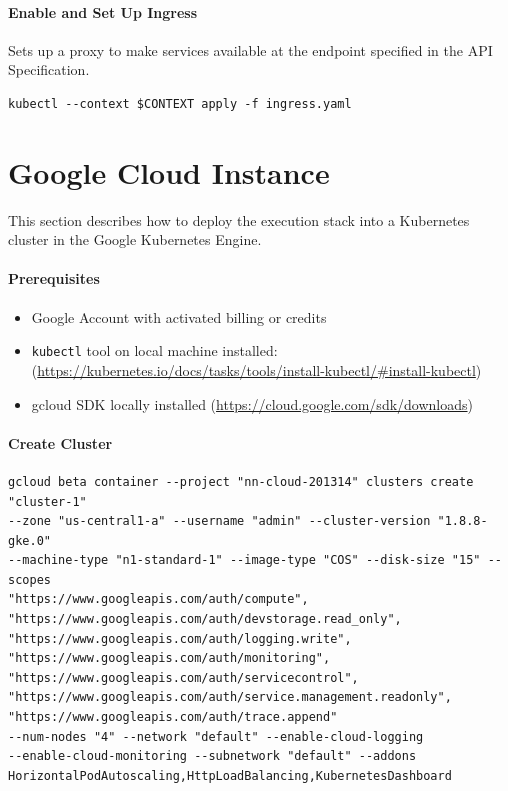 \paragraph{Enable and Set Up Ingress}\label{enable-and-set-up-ingress}

Sets up a proxy to make services available at the endpoint specified in
the API Specification.

\begin{verbatim}
kubectl --context $CONTEXT apply -f ingress.yaml
\end{verbatim}

\section{Google Cloud Instance}\label{google-cloud-instance}

This section describes how to deploy the execution stack into a
Kubernetes cluster in the Google Kubernetes Engine.

\paragraph{Prerequisites}\label{prerequisites-1}

\begin{itemize}
\item
  Google Account with activated billing or credits
\item
  \texttt{kubectl} tool on local machine installed:
  (\url{https://kubernetes.io/docs/tasks/tools/install-kubectl/\#install-kubectl})
\item
  gcloud SDK locally installed
  (\url{https://cloud.google.com/sdk/downloads})
\end{itemize}

\paragraph{Create Cluster}\label{create-cluster}

\begin{verbatim}
gcloud beta container --project "nn-cloud-201314" clusters create "cluster-1" 
--zone "us-central1-a" --username "admin" --cluster-version "1.8.8-gke.0" 
--machine-type "n1-standard-1" --image-type "COS" --disk-size "15" --scopes 
"https://www.googleapis.com/auth/compute",
"https://www.googleapis.com/auth/devstorage.read_only",
"https://www.googleapis.com/auth/logging.write",
"https://www.googleapis.com/auth/monitoring",
"https://www.googleapis.com/auth/servicecontrol",
"https://www.googleapis.com/auth/service.management.readonly",
"https://www.googleapis.com/auth/trace.append" 
--num-nodes "4" --network "default" --enable-cloud-logging 
--enable-cloud-monitoring --subnetwork "default" --addons 
HorizontalPodAutoscaling,HttpLoadBalancing,KubernetesDashboard
\end{verbatim}

